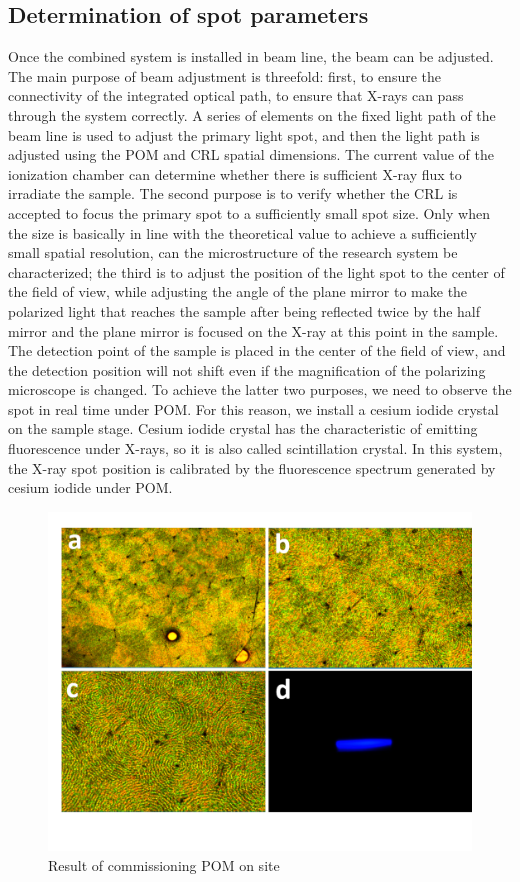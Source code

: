 \documentclass{Head}
\begin{document}
\subsection{Determination of spot parameters}
Once the combined system is installed in beam line, the beam can be adjusted.
The main purpose of beam adjustment is threefold: first, to ensure the connectivity of the integrated optical path, to ensure that X-rays can pass through the system correctly.
A series of elements on the fixed light path of the beam line is used to adjust the primary light spot, and then the light path is adjusted using the POM and CRL spatial dimensions.
The current value of the ionization chamber can determine whether there is sufficient X-ray flux to irradiate the sample.
The second purpose is to verify whether the CRL is accepted to focus the primary spot to a sufficiently small spot size.
Only when the size is basically in line with the theoretical value to achieve a sufficiently small spatial resolution, can the microstructure of the research system be characterized; the third is to adjust the position of the light spot to the center of the field of view, while adjusting the angle of the plane mirror to make the polarized light that reaches the sample after being reflected twice by the half mirror and the plane mirror is focused on the X-ray at this point in the sample.
The detection point of the sample is placed in the center of the field of view, and the detection position will not shift even if the magnification of the polarizing microscope is changed.
To achieve the latter two purposes, we need to observe the spot in real time under POM.
For this reason, we install a cesium iodide crystal on the sample stage. Cesium iodide crystal has the characteristic of emitting fluorescence under X-rays, so it is also called scintillation crystal. In this system, the X-ray spot position is calibrated by the fluorescence spectrum generated by cesium iodide under POM.
\begin{figure}
    \centering
    \includegraphics[scale=0.5]{Figures/Fig5CommissionPOMOnSite.png}
    \caption{Result of commissioning POM on site}
    \label{pictures}
\end{figure}
\end{document}
